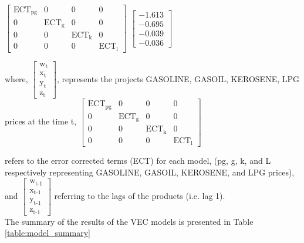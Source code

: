\documentclass{beamer}
\newcommand{\vspaceFive}{\vspace{5pt}}
\newcommand{\varGasoline}{w}
\newcommand{\varGasoil}{x}
\newcommand{\varKerosene}{y}
\newcommand{\varLpg}{z}
\newcommand{\subTT}[2]{\text{#1}_{\text{#2}}}
\begin{document}
\begin{frame}
			\begin{math}
				\begin{bmatrix}
					\subTT{ECT}{pg} & 0 & 0 & 0 \\
					0 & \subTT{ECT}{g} & 0 & 0 \\
					0 & 0 & \subTT{ECT}{k} & 0 \\
					0 & 0 & 0 & \subTT{ECT}{l}
				\end{bmatrix}
			\end{math}
			\begin{math}
				\begin{bmatrix}
					-1.613 \\
					-0.695 \\
					-0.039 \\
					-0.036
				\end{bmatrix}
			\end{math}	
	
	\end{frame}
	
	\begin{frame}
		where, 
		\begin{math}
			\begin{bmatrix}
				\subTT{\varGasoline}{t} \\
				\subTT{\varGasoil}{t} \\
				\subTT{\varKerosene}{t} \\
				\subTT{\varLpg}{t}
			\end{bmatrix}
		\end{math},
		represents the projects GASOLINE, GASOIL, KEROSENE, LPG prices at the time t,
		\begin{math}
			\begin{bmatrix}
				\subTT{ECT}{pg} & 0 & 0 & 0 \\
				0 & \subTT{ECT}{g} & 0 & 0 \\
				0 & 0 & \subTT{ECT}{k} & 0 \\
				0 & 0 & 0 & \subTT{ECT}{l}
			\end{bmatrix}
		\end{math}
		\vspaceFive
		
		refers to the error corrected terms (ECT) for each model,
		(pg, g, k, and L respectively representing GASOLINE, GASOIL, KEROSENE, and LPG prices), and
		\begin{math}
			\begin{bmatrix}
				\subTT{\varGasoline}{t-1} \\
				\subTT{\varGasoil}{t-1} \\
				\subTT{\varKerosene}{t-1} \\
				\subTT{\varLpg}{t-1}
			\end{bmatrix}
		\end{math} 
		referring to the lags of the products (i.e. lag 1). \\
		\vspaceFive
		The summary of the results of the VEC models is presented in Table \ref{table:model_summary}		
		
	\end{frame}
	
\end{document}
